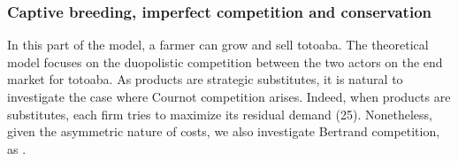 
\subsubsection{Captive breeding, imperfect competition and conservation}
In this part of the model, a farmer can grow and sell totoaba. The theoretical model focuses on the duopolistic competition between the two actors on the end market for totoaba. As products are strategic substitutes, it is natural to investigate the case where Cournot competition arises. Indeed, when products are substitutes, each firm tries to maximize its residual demand (25). Nonetheless, given the asymmetric nature of costs, we also investigate Bertrand competition, as \cite{damania_economics_2007}.
%
